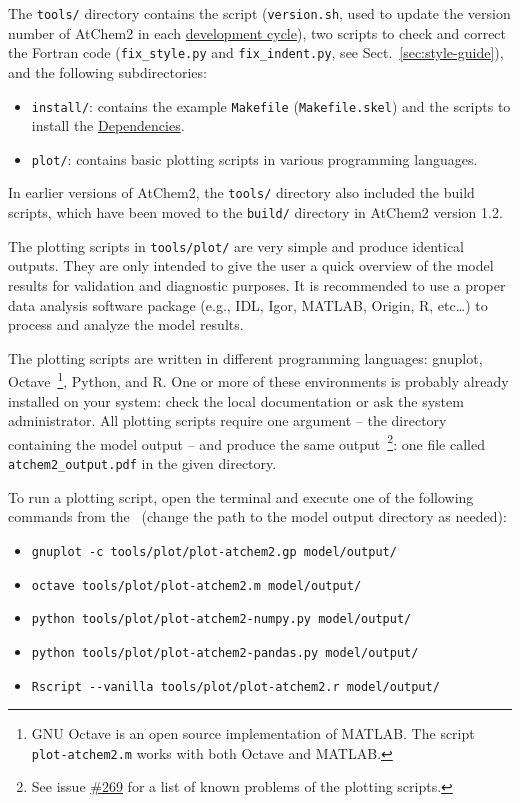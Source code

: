 The \texttt{tools/} directory contains the script
(\texttt{version.sh}, used to update the version number of AtChem2 in
each \hyperref[ch:development]{development cycle}), two scripts to
check and correct the Fortran code (\texttt{fix\_style.py} and
\texttt{fix\_indent.py}, see Sect.~\ref{sec:style-guide}), and the
following subdirectories:

\begin{itemize}
\item \texttt{install/}: contains the example \texttt{Makefile}
  (\texttt{Makefile.skel}) and the scripts to install the
  \hyperref[sec:dependencies]{Dependencies}.
\item \texttt{plot/}: contains basic plotting scripts in various
  programming languages.
\end{itemize}

In earlier versions of AtChem2, the \texttt{tools/} directory also
included the build scripts, which have been moved to the
\texttt{build/} directory in AtChem2 version 1.2.

The plotting scripts in \texttt{tools/plot/} are very simple and
produce identical outputs. They are only intended to give the user a
quick overview of the model results for validation and diagnostic
purposes. It is recommended to use a proper data analysis software
package (e.g., IDL, Igor, MATLAB, Origin, R, etc\ldots) to process and
analyze the model results.

The plotting scripts are written in different programming languages:
gnuplot, Octave~\footnote{GNU Octave is an open source implementation
  of MATLAB. The script \texttt{plot-atchem2.m} works with both Octave
  and MATLAB.}, Python, and R. One or more of these environments is
probably already installed on your system: check the local
documentation or ask the system administrator. All plotting scripts
require one argument -- the directory containing the model output --
and produce the same output~\footnote{See issue
  \href{https://github.com/AtChem/AtChem2/issues/269}{\#269} for a
  list of known problems of the plotting scripts.}: one file called
\texttt{atchem2\_output.pdf} in the given directory.

To run a plotting script, open the terminal and execute one of the
following commands from the \maindir\ (change the path to the model
output directory as needed):

\begin{itemize}
\item \verb|gnuplot -c tools/plot/plot-atchem2.gp model/output/|
\item \verb|octave tools/plot/plot-atchem2.m model/output/|
\item \verb|python tools/plot/plot-atchem2-numpy.py model/output/|
\item \verb|python tools/plot/plot-atchem2-pandas.py model/output/|
\item \verb|Rscript --vanilla tools/plot/plot-atchem2.r model/output/|
\end{itemize}

